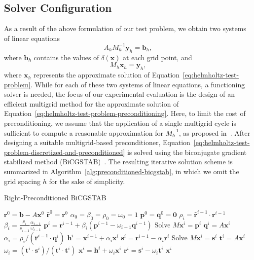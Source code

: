 \subsection{Solver Configuration}
\label{sec:solver-configuration-helmholtz}
As a result of the above formulation of our test problem, we obtain two systems of linear equations
\begin{equation}
	A_h M_h^{-1} \bm{y}_h = \bm{b}_h,
	\label{eq:helmholtz-test-problem-discretized-and-preconditioned}
\end{equation}
where $\bm{b}_h$ contains the values of $\delta(\bm{x})$ at each grid point, and
\begin{equation}
	M_h \bm{x}_h = \bm{y}_h,
	\label{eq:helmholtz-test-problem-preconditioning}
\end{equation}
where $\bm{x}_h$ represents the approximate solution of Equation~\eqref{eq:helmholtz-test-problem}.
While for each of these two systems of linear equations, a functioning solver is needed, the focus of our experimental evaluation is the design of an efficient multigrid method for the approximate solution of Equation~\eqref{eq:helmholtz-test-problem-preconditioning}.
Here, to limit the cost of preconditioning, we assume that the application of a single multigrid cycle is sufficient to compute a reasonable approximation for $M_{h}^{-1}$, as proposed in~\cite{erlangga2008advances}.
After designing a suitable multigrid-based preconditioner, Equation~\eqref{eq:helmholtz-test-problem-discretized-and-preconditioned} is solved using the biconjugate gradient stabilized method (BiCGSTAB)~\cite{saad2003iterative}.
The resulting iterative solution scheme is summarized in Algorithm~\ref{alg:preconditioned-bicgstab}, in which we omit the grid spacing $h$ for the sake of simplicity.
\begin{algorithm}
	\caption{Right-Preconditioned BiCGSTAB}
	\label{alg:preconditioned-bicgstab}
	\begin{algorithmic}[1] %
			\State $\bm{r}^0 = \bm{b} - A \bm{x}^0$
			\State $\bm{\hat{r}}^0 = \bm{r}^0$
			\State $\alpha_0 = \beta_0 = \rho_0 = \omega_0 = 1$
			\State $\bm{p}^0 = \bm{q}^0 = \bm{0}$
			\State $\rho_i = \bm{\hat{r}}^{i-1} \cdot \bm{r}^{i-1}$
			\State $\beta_i = \frac{\rho_i }{\rho_{i-1} }\frac{\alpha_{i-1}}{ \omega_{i-1}}$
			\State $\bm{p}^i = \bm{r}^{i-1} + \beta_i (\bm{p}^{i-1} - \omega_{i-1} \bm{q}^{i-1})$
			\State Solve $M \bm{x}^i = \bm{p}^i$
			\State $\bm{q}^i = A \bm{x}^i$
			\State $\alpha_i = \rho_i / (\bm{\hat{r}}^{i-1} \cdot \bm{q}^i)$
			\State $\bm{h}^i = \bm{x}^{i-1} + \alpha_i \bm{x}^i$	
			\State $\bm{s}^i = \bm{r}^{i-1} - \alpha_i \bm{r}^i$
			\State Solve $M \bm{x}^i = \bm{s}^i$
			\State $\bm{t}^i = A \bm{x}^i$
			\State $\omega_i = (\bm{t}^i \cdot \bm{s}^i) / (\bm{t}^i \cdot \bm{t}^i)$
			\State $\bm{x}^i = \bm{h}^i + \omega_i \bm{x}^i$
			\State $\bm{r}^i = \bm{s}^i - \omega_i \bm{t}^i$
			\Return $\bm{x}^i$
			\EndIf
			\EndFor
		\end{algorithmic}
\end{algorithm}
